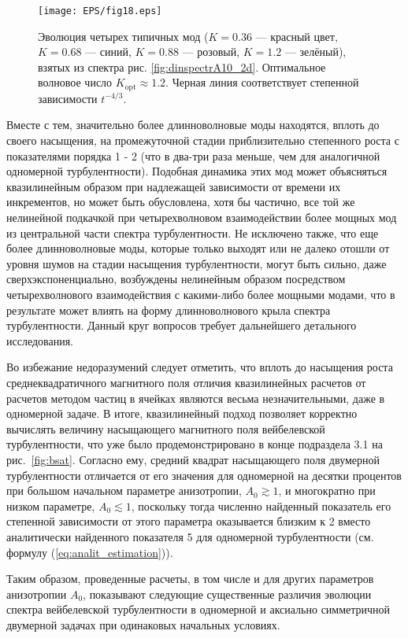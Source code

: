 \begin{figure}[b]
\centering
\texttt{[image: EPS/fig18.eps]}
\caption{Эволюция четырех типичных мод ($K=0.36$ --- красный цвет, $K=0.68$ --- синий, $K=0.88$ --- розовый, $K=1.2$ --- зелёный), взятых из спектра рис. \ref{fig:dinspectrA10_2d}. Оптимальное волновое число $K_\mathrm{opt}\approx1.2$. Черная линия соответствует степенной зависимости $t^{-4/3}$.}
\label{fig:evol_garm}
\end{figure}
Вместе с тем, значительно более длинноволновые моды находятся, вплоть до своего насыщения, на промежуточной стадии приблизительно степенного роста с показателями порядка 1 - 2 (что в два-три раза меньше, чем для аналогичной одномерной турбулентности). Подобная динамика этих мод может объясняться квазилинейным образом при надлежащей зависимости от времени их инкрементов, но может быть обусловлена, хотя бы частично, все той же нелинейной подкачкой при четырехволновом взаимодействии более мощных мод из центральной части спектра турбулентности. Не исключено также, что еще более длинноволновые моды, которые только выходят или не далеко отошли от уровня шумов на стадии насыщения турбулентности, могут быть сильно, даже сверхэкспоненциально, возбуждены нелинейным образом посредством четырехволнового взаимодействия с какими-либо более мощными модами, что в результате может влиять на форму длинноволнового крыла спектра турбулентности. Данный круг вопросов требует дальнейшего детального исследования. 

Во избежание недоразумений следует отметить, что вплоть до насыщения роста среднеквадратичного магнитного поля отличия квазилинейных расчетов от расчетов методом частиц в ячейках являются весьма незначительными, даже в одномерной задаче. В итоге, квазилинейный подход позволяет корректно вычислять величину насыщающего магнитного поля вейбелевской турбулентности, что уже было продемонстрировано в конце подраздела 3.1 на рис.~\ref{fig:bsat}. Согласно ему, средний квадрат насыщающего поля двумерной турбулентности отличается от его значения для одномерной на десятки процентов при большом начальном параметре анизотропии, $A_0\gtrsim1$, и многократно при низком параметре, $A_0\lesssim1$, поскольку тогда численно найденный показатель его степенной зависимости от этого параметра оказывается близким к 2 вместо аналитически найденного показателя 5 для одномерной турбулентности (см. формулу (\ref{eq:analit_estimation})). 

Таким образом, проведенные расчеты, в том числе и для других параметров анизотропии $A_0$, показывают следующие существенные различия эволюции спектра вейбелевской турбулентности в одномерной и аксиально симметричной двумерной задачах при одинаковых начальных условиях. 

